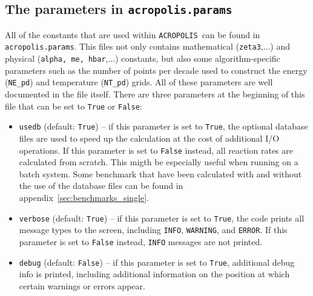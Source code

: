 \documentclass[11pt,a4paper]{article}
\newcommand{\acropolis}{\texttt{ACROPOLIS}~}
\begin{document}
\subsection{The parameters in \texttt{acropolis.params}}
\label{sec:params}
All of the constants that are used within \acropolis can be found in \texttt{acropolis.params}. This files not only contains mathematical (\texttt{zeta3},...) and physical (\texttt{alpha, me, hbar},...) constants, but also some algorithm-specific parameters such as the number of points per decade used to construct the energy (\texttt{NE\_pd}) and temperature (\texttt{NT\_pd}) grids. All of these parameters are well documented in the file itself.
There are three parameters at the beginning of this file that can be set to \texttt{True} or \texttt{False}:
\begin{itemize}
	\item \texttt{usedb} (default: \texttt{True}) -- if this parameter is set to \texttt{True}, the optional database files are used to speed up the calculation at the cost of additional I/O operations. If this parameter is set to \texttt{False} instead, all reaction rates are calculated from scratch. This migth be especially useful when running on a batch system. Some benchmark that have been calculated with and without the use of the database files can be found in appendix~\ref{sec:benchmarks_single}.
	\item \texttt{verbose} (default: \texttt{True}) -- if this parameter is set to \texttt{True}, the code prints all message types to the screen, including \texttt{INFO}, \texttt{WARNING}, and \texttt{ERROR}. If this parameter is set to \texttt{False} instead, \texttt{INFO} messages are not printed.
	\item \texttt{debug} (default: \texttt{False}) -- if this parameter is set to \texttt{True}, additional debug info is printed, including additional information on the position at which certain warnings or errors appear.
\end{itemize}
\end{document}
